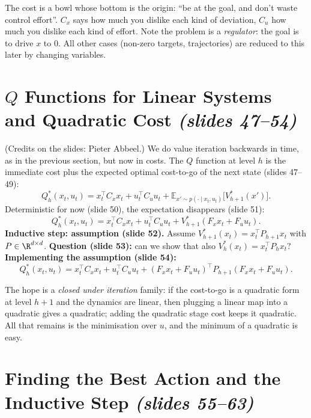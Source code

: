 \documentclass[11pt,a4paper]{article}
\newcommand{\E}{\mathbb{E}}
\newcommand{\slides}[1]{\emph{(slides #1)}}
\theoremstyle{plain}
\theoremstyle{definition}
\theoremstyle{remark}
\begin{document}
\begin{intuition}
The cost is a bowl whose bottom is the origin: ``be at the goal, and don't waste control effort''. $C_x$ says how much you dislike each kind of deviation, $C_u$ how much you dislike each kind of effort. Note the problem is a \emph{regulator}: the goal is to drive $x$ to $0$. All other cases (non-zero targets, trajectories) are reduced to this later by changing variables.
\end{intuition}

\section{$Q$ Functions for Linear Systems and Quadratic Cost \slides{47--54}}

(Credits on the slides: Pieter Abbeel.) We do value iteration backwards in time, as in the previous section, but now in costs. The $Q$ function at level $h$ is the immediate cost plus the expected optimal cost-to-go of the next state (slides 47--49):
\[
Q^*_h(x_t,u_t)=x_t^\top C_xx_t+u_t^\top C_uu_t+\E_{x'\sim p(\cdot\mid x_t,u_t)}\big[V^*_{h+1}(x')\big].
\]
Deterministic for now (slide 50), the expectation disappears (slide 51):
\[
Q^*_h(x_t,u_t)=x_t^\top C_xx_t+u_t^\top C_uu_t+V^*_{h+1}(F_xx_t+F_uu_t).
\]
\textbf{Inductive step: assumption (slide 52).} Assume $V^*_{h+1}(x_t)=x_t^\top P_{h+1}x_t$ with $P\in\R^{d\times d}$. \textbf{Question (slide 53):} can we show that also $V^*_h(x_t)=x_t^\top P_hx_t$? \textbf{Implementing the assumption (slide 54):}
\[
Q^*_h(x_t,u_t)=x_t^\top C_xx_t+u_t^\top C_uu_t+(F_xx_t+F_uu_t)^\top P_{h+1}(F_xx_t+F_uu_t).
\]

\begin{intuition}
The hope is a \emph{closed under iteration} family: if the cost-to-go is a quadratic form at level $h+1$ and the dynamics are linear, then plugging a linear map into a quadratic gives a quadratic; adding the quadratic stage cost keeps it quadratic. All that remains is the minimisation over $u$, and the minimum of a quadratic is easy.
\end{intuition}

\section{Finding the Best Action and the Inductive Step \slides{55--63}}
\end{document}
